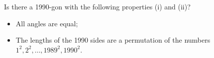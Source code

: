Is there a 1990-gon with the following properties (i) and (ii)?
\begin{itemize}
\item[(i)] All angles are equal;
\item[(ii)] The lengths of the 1990 sides are a permutation of the numbers $1^2, 2^2, \ldots, 1989^2, 1990^2$.
\end{itemize}
